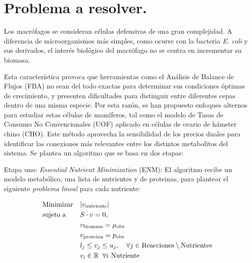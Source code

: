\documentclass[letterpaper,12pt]{article}
\theoremstyle{definition}
\theoremstyle{remark}
\begin{document}
\tableofcontents
\newpage

\section{Problema a resolver.}

Los macrófagos se consideran células defensivas de una gran complejidad. A diferencia de microorganismos más simples, como ocurre con la bacteria \textit{E. coli} y sus derivados, el interés biológico del macrófago no se centra en incrementar su biomasa. 

Esta característica provoca que herramientas como el Análisis de Balance de Flujos (FBA) no sean del todo exactas para determinar sus condiciones óptimas de crecimiento, y presenten dificultades para distinguir entre diferentes cepas dentro de una misma especie. Por esta razón, se han propuesto enfoques alternos para estudiar estas células de mamíferos, tal como el modelo de Tasas de Consumo No Convencionales (UOF) aplicado en células de ovario de hámster chino (CHO). Este método aprovecha la sensibilidad de los precios duales para identificar las conexiones más relevantes entre los distintos metabolitos del sistema. Se plantea un algoritmo que se basa en dos etapas:

\vspace{0.3 cm}

\noindent Etapa uno: \textit{Essential Nutrient Minimization} (ENM): El algoritmo recibe un modelo metabólico, una lista de nutrientes y de proteinas, para plantear el siguiente \textit{problema lineal} para cada nutriente:


\begin{equation}
 \begin{aligned}
        & {\text{Minimizar}} & &| v_{\text{nutriente}}| \\
        & \text{sujeto a}               & & S \cdot v = 0, \\
        &                                && v_{\text{biomasa}}=\mu_{\text{obs}}\\
          &                               && v_{\text{proteina}}=p_{\text{obs}}\\
        &                                & & l_j \le v_j \le u_j, \quad \forall j \in\text{Reacciones}\setminus \text{Nutrientes}\\
        &                                && v_\text{i}\in \mathbb{R} \hspace{0.2 cm}\forall i \text{ Nutriente}
    \end{aligned}
\end{equation} 
\end{document}
